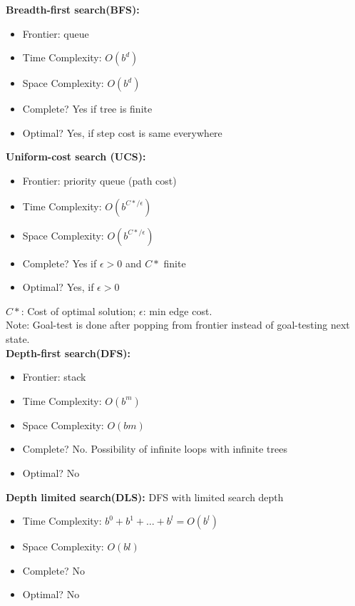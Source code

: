 \documentclass[10pt,landscape]{article}
\begin{document}
\begin{multicols}{3}
\begin{scriptsize}
\textbf{Breadth-first search(BFS):}
\begin{itemize}
  \item Frontier: queue
  \item Time Complexity: $O(b^d)$
  \item Space Complexity: $O(b^d)$
  \item Complete? Yes if tree is finite
  \item Optimal? Yes, if step cost is same everywhere
\end{itemize}
\textbf{Uniform-cost search (UCS):}\\
\begin{itemize}
  \item Frontier: priority queue (path cost)
  \item Time Complexity: $O(b^{C*/\epsilon})$
  \item Space Complexity: $O(b^{C*/\epsilon})$
  \item Complete? Yes if $\epsilon > 0$ and $C*$ finite
  \item Optimal? Yes, if $\epsilon > 0$
\end{itemize}
$C*$: Cost of optimal solution; $\epsilon$: min edge cost.\\
Note: Goal-test is done after popping from frontier instead of goal-testing next state.\\
\textbf{Depth-first search(DFS):}
\begin{itemize}
  \item Frontier: stack
  \item Time Complexity: $O(b^m)$
  \item Space Complexity: $O(bm)$
  \item Complete? No. Possibility of infinite loops with infinite trees
  \item Optimal? No
\end{itemize}
\textbf{Depth limited search(DLS):} DFS with limited search depth
\begin{itemize}
  \item Time Complexity: $b^0 + b^1 + \ldots + b^l = O(b^l)$
  \item Space Complexity: $O(bl)$
  \item Complete? No
  \item Optimal? No
\end{itemize}


\end{scriptsize}
\end{multicols}
\end{document}
